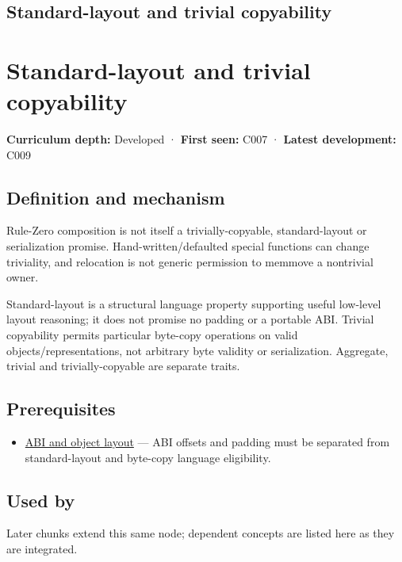 \hypertarget{appendix-958870a64c53}{}
\section*{Standard-layout and trivial copyability}
\chapter{Standard-layout and trivial copyability}\label{appendix-958870a64c53-standard-layout-and-trivial-copyability}

\textbf{Curriculum depth:} Developed · \textbf{First seen:} C007 · \textbf{Latest development:} C009

\section{Definition and mechanism}\label{appendix-958870a64c53-definition-and-mechanism}

Rule-Zero composition is not itself a trivially-copyable, standard-layout or serialization promise. Hand-written/defaulted special functions can change triviality, and relocation is not generic permission to memmove a nontrivial owner.

Standard-layout is a structural language property supporting useful low-level layout reasoning; it does not promise no padding or a portable ABI. Trivial copyability permits particular byte-copy operations on valid objects/representations, not arbitrary byte validity or serialization. Aggregate, trivial and trivially-copyable are separate traits.

\section{Prerequisites}\label{appendix-958870a64c53-prerequisites}

\begin{itemize}
\tightlist
\item
  \hyperref[appendix-c4ac6bb0fff8]{ABI and object layout} --- ABI offsets and padding must be separated from standard-layout and byte-copy language eligibility.
\end{itemize}

\section{Used by}\label{appendix-958870a64c53-used-by}

Later chunks extend this same node; dependent concepts are listed here as they are integrated.


